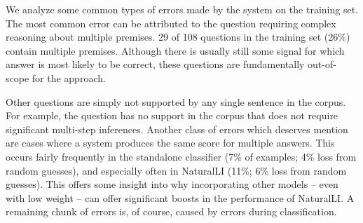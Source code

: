 %
%



%
%

We analyze some common types of errors made by the system on the training set.
The most common error can be attributed to the question requiring complex reasoning
  about multiple premises.
\num{29} of \num{108} questions in the training set (26\%) contain multiple
  premises.
Although there is usually still some signal for which answer is most likely to be correct,
  these questions are fundamentally out-of-scope for the approach.

Other questions are simply not supported by any single sentence in the corpus.
For example, the question  has
  no support in the corpus that does not require significant multi-step inferences.
Another class of errors which deserves mention are cases where a system produces
  the same score for multiple answers.
This occurs fairly frequently in the standalone classifier 
  (7\% of examples; 4\% loss from random guesses),
  and especially often in NaturalLI (11\%; 6\% loss from random guesses).
This offers some insight into why incorporating other models -- even with
  low weight -- can offer significant boosts in the performance
  of NaturalLI.
A remaining chunk of errors is, of course, caused by errors during classification.

